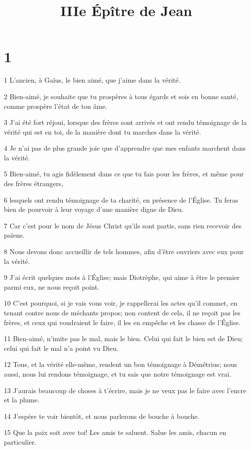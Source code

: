 

\title{IIIe Épître de Jean}


\chapter{1}

\par 1 L'ancien, à Gaïus, le bien aimé, que j'aime dans la vérité.
\par 2 Bien-aimé, je souhaite que tu prospères à tous égards et sois en bonne santé, comme prospère l'état de ton âme.
\par 3 J'ai été fort réjoui, lorsque des frères sont arrivés et ont rendu témoignage de la vérité qui est en toi, de la manière dont tu marches dans la vérité.
\par 4 Je n'ai pas de plus grande joie que d'apprendre que mes enfants marchent dans la vérité.
\par 5 Bien-aimé, tu agis fidèlement dans ce que tu fais pour les frères, et même pour des frères étrangers,
\par 6 lesquels ont rendu témoignage de ta charité, en présence de l'Église. Tu feras bien de pourvoir à leur voyage d'une manière digne de Dieu.
\par 7 Car c'est pour le nom de Jésus Christ qu'ils sont partis, sans rien recevoir des païens.
\par 8 Nous devons donc accueillir de tels hommes, afin d'être ouvriers avec eux pour la vérité.
\par 9 J'ai écrit quelques mots à l'Église; mais Diotrèphe, qui aime à être le premier parmi eux, ne nous reçoit point.
\par 10 C'est pourquoi, si je vais vous voir, je rappellerai les actes qu'il commet, en tenant contre nous de méchants propos; non content de cela, il ne reçoit pas les frères, et ceux qui voudraient le faire, il les en empêche et les chasse de l'Église.
\par 11 Bien-aimé, n'imite pas le mal, mais le bien. Celui qui fait le bien est de Dieu; celui qui fait le mal n'a point vu Dieu.
\par 12 Tous, et la vérité elle-même, rendent un bon témoignage à Démétrius; nous aussi, nous lui rendons témoignage, et tu sais que notre témoignage est vrai.
\par 13 J'aurais beaucoup de choses à t'écrire, mais je ne veux pas le faire avec l'encre et la plume.
\par 14 J'espère te voir bientôt, et nous parlerons de bouche à bouche.
\par 15 Que la paix soit avec toi! Les amis te saluent. Salue les amis, chacun en particulier.


